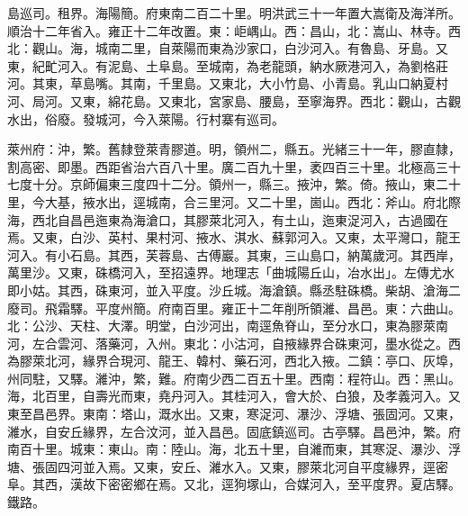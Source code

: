 \begin{pinyinscope}
島巡司。租界。海陽簡。府東南二百二十里。明洪武三十一年置大嵩衛及海洋所。順治十二年省入。雍正十二年改置。東：岠嵎山。西：昌山，北：嵩山、林寺。西北：觀山。海，城南二里，自萊陽而東為沙家口，白沙河入。有魯島、牙島。又東，紀甿河入。有泥島、土阜島。至城南，為老龍頭，納水厥港河入，為劉格莊河。其東，草島嘴。其南，千里島。又東北，大小竹島、小青島。乳山口納夏村河、局河。又東，綿花島。又東北，宮家島、腰島，至寧海界。西北：觀山，古觀水出，俗廢。發城河，今入萊陽。行村寨有巡司。

萊州府：沖，繁。舊隸登萊青膠道。明，領州二，縣五。光緒三十一年，膠直隸，割高密、即墨。西距省治六百八十里。廣二百九十里，袤四百三十里。北極高三十七度十分。京師偏東三度四十二分。領州一，縣三。掖沖，繁。倚。掖山，東二十里，今大基，掖水出，逕城南，合三里河。又二十里，崮山。西北：斧山。府北際海，西北自昌邑迤東為海滄口，其膠萊北河入，有土山，迤東浞河入，古過國在焉。又東，白沙、英村、果村河、掖水、淇水、蘇郭河入。又東，太平灣口，龍王河入。有小石島。其西，芙蓉島、古傅巖。其東，三山島口，納萬歲河。其西岸，萬里沙。又東，硃橋河入，至招遠界。地理志「曲城陽丘山，冶水出」。左傳尤水即小姑。其西，硃東河，並入平度。沙丘城。海滄鎮。縣丞駐硃橋。柴胡、滄海二廢司。飛霜驛。平度州簡。府南百里。雍正十二年削所領濰、昌邑。東：六曲山。北：公沙、天柱、大澤。明堂，白沙河出，南逕魚脊山，至分水口，東為膠萊南河，左合雲河、落藥河，入州。東北：小沽河，自掖緣界合硃東河，墨水從之。西為膠萊北河，緣界合現河、龍王、韓村、藥石河，西北入掖。二鎮：亭口、灰埠，州同駐，又驛。濰沖，繁，難。府南少西二百五十里。西南：程符山。西：黑山。海，北百里，自壽光而東，堯丹河入。其桂河入，會大於、白狼，及孝義河入。又東至昌邑界。東南：塔山，溉水出。又東，寒浞河、瀑沙、浮塘、張固河。又東，濰水，自安丘緣界，左合汶河，並入昌邑。固底鎮巡司。古亭驛。昌邑沖，繁。府南百十里。城東：東山。南：陸山。海，北五十里，自濰而東，其寒浞、瀑沙、浮塘、張固四河並入焉。又東，安丘、濰水入。又東，膠萊北河自平度緣界，逕密阜。其西，漢故下密密鄉在焉。又北，逕狗塚山，合媒河入，至平度界。夏店驛。鐵路。


\end{pinyinscope}
